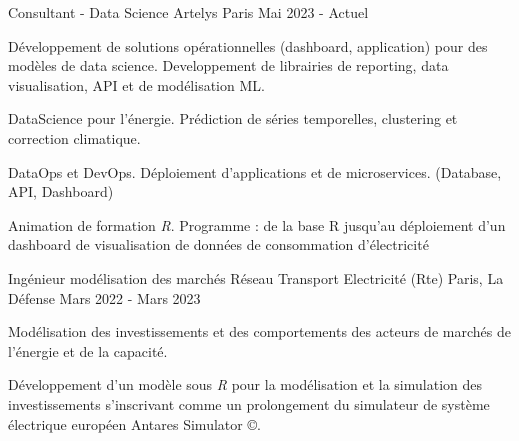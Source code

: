 

\begin{cventries}

 \cventry
    {Consultant - Data Science} %
    {Artelys} %
    {Paris} %
    {Mai 2023 - Actuel} %
    {
      \begin{cvitems} %
        \item {Développement de solutions opérationnelles (dashboard, application) pour des modèles de data science. Developpement de librairies de reporting, data visualisation, API et de modélisation ML.}
        \item {DataScience pour l'énergie. Prédiction de séries temporelles, clustering et correction climatique.}
        \item {DataOps et DevOps. Déploiement d'applications et de microservices. (Database, API, Dashboard)}
        \item {Animation de formation \textit{R}. Programme : de la base R jusqu’au déploiement d’un dashboard de visualisation de données de consommation d'électricité}
      \end{cvitems}
    }
    

  \cventry
    {Ingénieur modélisation des marchés} %
    {Réseau Transport Electricité (Rte)} %
    {Paris, La Défense} %
    {Mars 2022 - Mars 2023} %
    {
      \begin{cvitems} %
        \item {Modélisation des investissements et des comportements des acteurs de marchés de l'énergie et de la capacité.}
        \item {Développement d'un modèle sous \textit{R} pour la modélisation et la simulation des investissements s'inscrivant comme un prolongement du simulateur de système électrique européen Antares Simulator \copyright.}
      \end{cvitems}
    }


\end{cventries}
